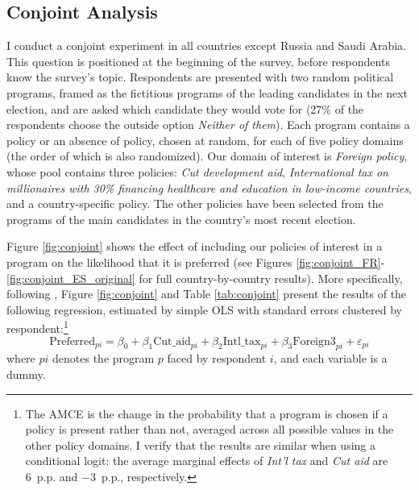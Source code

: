 \documentclass[12pt,english]{article}
\begin{document}
\begin{bibunit}
\subsection{Conjoint Analysis}\label{subsec:conjoint}

I conduct a conjoint experiment in all countries except Russia and Saudi Arabia. This question is positioned at the beginning of the survey, before respondents know the survey's topic. Respondents are presented with two random political programs, framed as the fictitious programs of the leading candidates in the next election, and are asked which candidate they would vote for (27\% of the respondents choose the outside option \textit{Neither of them}). Each program contains a policy or an absence of policy, chosen at random, for each of five policy domains (the order of which is also randomized). Our domain of interest is \textit{Foreign policy}, whose pool contains three policies: \textit{Cut development aid}, \textit{International tax on millionaires with 30\% financing healthcare and education in low-income countries}, and a country-specific policy. The other policies have been selected from the programs of the main candidates in the country's most recent election.

Figure \ref{fig:conjoint} shows the effect of including our policies of interest in a program on the likelihood that it is preferred (see Figures \ref{fig:conjoint_FR}-\ref{fig:conjoint_ES_original} for full country-by-country results). More specifically, following \cite{hainmueller_causal_2014}, Figure \ref{fig:conjoint} and Table \ref{tab:conjoint} present the results %
of the following regression, estimated by simple OLS with standard errors clustered by respondent:\footnote{The AMCE is the change in the probability that a program is chosen if a policy is present rather than not, averaged across all possible values in the other policy domains. I verify that the results are similar when using a conditional logit: the average marginal effects of \textit{Int'l tax} and \textit{Cut aid} are 6~p.p. and $-$3~p.p., respectively.}
\begin{equation}\label{eq:conjoint}
\text{Preferred}_{pi} = \beta_0 + \beta_1 \text{Cut\_aid}_{pi} + \beta_2 \text{Intl\_tax}_{pi} + \beta_3 \text{Foreign3}_{pi} + \varepsilon_{pi}
\end{equation}
where $pi$ denotes the program $p$ faced by respondent $i$, and each variable is a dummy.


\end{bibunit}
\end{document}
